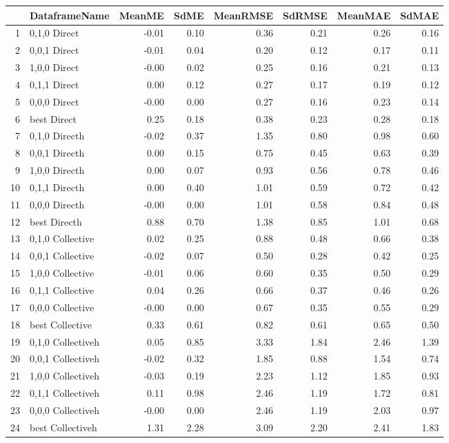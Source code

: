 \begin{table}[ht]
\centering
\begin{tabular}{rlrrrrrr}
  \hline
 & DataframeName & MeanME & SdME & MeanRMSE & SdRMSE & MeanMAE & SdMAE \\ 
  \hline
1 & 0,1,0 Direct & -0.01 & 0.10 & 0.36 & 0.21 & 0.26 & 0.16 \\ 
  2 & 0,0,1 Direct & -0.01 & 0.04 & 0.20 & 0.12 & 0.17 & 0.11 \\ 
  3 & 1,0,0 Direct & -0.00 & 0.02 & 0.25 & 0.16 & 0.21 & 0.13 \\ 
  4 & 0,1,1 Direct & 0.00 & 0.12 & 0.27 & 0.17 & 0.19 & 0.12 \\ 
  5 & 0,0,0 Direct & -0.00 & 0.00 & 0.27 & 0.16 & 0.23 & 0.14 \\ 
  6 & best Direct & 0.25 & 0.18 & 0.38 & 0.23 & 0.28 & 0.18 \\ 
  7 & 0,1,0 Directh & -0.02 & 0.37 & 1.35 & 0.80 & 0.98 & 0.60 \\ 
  8 & 0,0,1 Directh & 0.00 & 0.15 & 0.75 & 0.45 & 0.63 & 0.39 \\ 
  9 & 1,0,0 Directh & 0.00 & 0.07 & 0.93 & 0.56 & 0.78 & 0.46 \\ 
  10 & 0,1,1 Directh & 0.00 & 0.40 & 1.01 & 0.59 & 0.72 & 0.42 \\ 
  11 & 0,0,0 Directh & -0.00 & 0.00 & 1.01 & 0.58 & 0.84 & 0.48 \\ 
  12 & best Directh & 0.88 & 0.70 & 1.38 & 0.85 & 1.01 & 0.68 \\ 
  13 & 0,1,0 Collective & 0.02 & 0.25 & 0.88 & 0.48 & 0.66 & 0.38 \\ 
  14 & 0,0,1 Collective & -0.02 & 0.07 & 0.50 & 0.28 & 0.42 & 0.25 \\ 
  15 & 1,0,0 Collective & -0.01 & 0.06 & 0.60 & 0.35 & 0.50 & 0.29 \\ 
  16 & 0,1,1 Collective & 0.04 & 0.26 & 0.66 & 0.37 & 0.46 & 0.26 \\ 
  17 & 0,0,0 Collective & -0.00 & 0.00 & 0.67 & 0.35 & 0.55 & 0.29 \\ 
  18 & best Collective & 0.33 & 0.61 & 0.82 & 0.61 & 0.65 & 0.50 \\ 
  19 & 0,1,0 Collectiveh & 0.05 & 0.85 & 3.33 & 1.84 & 2.46 & 1.39 \\ 
  20 & 0,0,1 Collectiveh & -0.02 & 0.32 & 1.85 & 0.88 & 1.54 & 0.74 \\ 
  21 & 1,0,0 Collectiveh & -0.03 & 0.19 & 2.23 & 1.12 & 1.85 & 0.93 \\ 
  22 & 0,1,1 Collectiveh & 0.11 & 0.98 & 2.46 & 1.19 & 1.72 & 0.81 \\ 
  23 & 0,0,0 Collectiveh & -0.00 & 0.00 & 2.46 & 1.19 & 2.03 & 0.97 \\ 
  24 & best Collectiveh & 1.31 & 2.28 & 3.09 & 2.20 & 2.41 & 1.83 \\ 
   \hline
\end{tabular}
\end{table}

